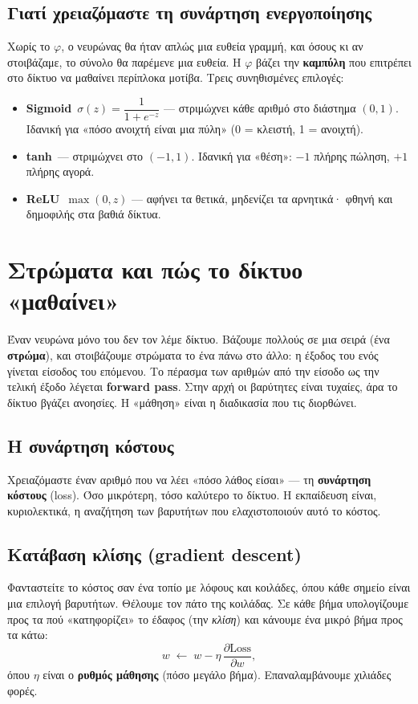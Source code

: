 \documentclass[11pt]{article}
\begin{document}
\subsection{Γιατί χρειαζόμαστε τη συνάρτηση ενεργοποίησης}
Χωρίς το $\varphi$, ο νευρώνας θα ήταν απλώς μια ευθεία γραμμή, και όσους κι αν στοιβάζαμε, το σύνολο
θα παρέμενε μια ευθεία. Η $\varphi$ βάζει την \textbf{καμπύλη} που επιτρέπει στο δίκτυο να μαθαίνει
περίπλοκα μοτίβα. Τρεις συνηθισμένες επιλογές:
\begin{itemize}[nosep,leftmargin=1.4em]
\item \textbf{Sigmoid}\, $\sigma(z)=\dfrac{1}{1+e^{-z}}$ --- στριμώχνει κάθε αριθμό στο διάστημα
$(0,1)$. Ιδανική για «πόσο ανοιχτή είναι μια πύλη» (0 = κλειστή, 1 = ανοιχτή).
\item \textbf{tanh}\, --- στριμώχνει στο $(-1,1)$. Ιδανική για «θέση»: $-1$ πλήρης πώληση, $+1$ πλήρης αγορά.
\item \textbf{ReLU}\, $\max(0,z)$ --- αφήνει τα θετικά, μηδενίζει τα αρνητικά· φθηνή και δημοφιλής στα βαθιά δίκτυα.
\end{itemize}

\section{Στρώματα και πώς το δίκτυο «μαθαίνει»}

Έναν νευρώνα μόνο του δεν τον λέμε δίκτυο. Βάζουμε πολλούς σε μια σειρά (ένα \textbf{στρώμα}), και
στοιβάζουμε στρώματα το ένα πάνω στο άλλο: η έξοδος του ενός γίνεται είσοδος του επόμενου. Το πέρασμα
των αριθμών από την είσοδο ως την τελική έξοδο λέγεται \textbf{forward pass}. Στην αρχή οι βαρύτητες
είναι τυχαίες, άρα το δίκτυο βγάζει ανοησίες. Η «μάθηση» είναι η διαδικασία που τις διορθώνει.

\subsection{Η συνάρτηση κόστους}
Χρειαζόμαστε έναν αριθμό που να λέει «πόσο λάθος είσαι» --- τη \textbf{συνάρτηση κόστους} (loss). Όσο
μικρότερη, τόσο καλύτερο το δίκτυο. Η εκπαίδευση είναι, κυριολεκτικά, η αναζήτηση των βαρυτήτων που
ελαχιστοποιούν αυτό το κόστος.

\subsection{Κατάβαση κλίσης (gradient descent)}
Φανταστείτε το κόστος σαν ένα τοπίο με λόφους και κοιλάδες, όπου κάθε σημείο είναι μια επιλογή
βαρυτήτων. Θέλουμε τον πάτο της κοιλάδας. Σε κάθε βήμα υπολογίζουμε προς τα πού «κατηφορίζει» το έδαφος
(την \emph{κλίση}) και κάνουμε ένα μικρό βήμα προς τα κάτω:
\[
w \;\leftarrow\; w - \eta \,\frac{\partial \text{Loss}}{\partial w},
\]
όπου $\eta$ είναι ο \textbf{ρυθμός μάθησης} (πόσο μεγάλο βήμα). Επαναλαμβάνουμε χιλιάδες φορές.
\end{document}
